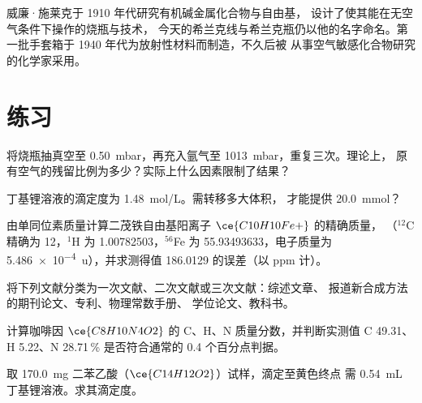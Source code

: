 \begin{history}[施莱克的玻璃仪器]
威廉·施莱克于 1910 年代研究有机碱金属化合物与自由基，
设计了使其能在无空气条件下操作的烧瓶与技术，
今天的希兰克线与希兰克瓶仍以他的名字命名。第一批手套箱于
1940 年代为放射性材料而制造，不久后被
从事空气敏感化合物研究的化学家采用。
\end{history}

\section{练习}

\begin{exercise}[$\star$]\label{exo:b3:lab-techniques-3:1}
将烧瓶抽真空至 \qty{0.50}{mbar}，再充入氩气至 \qty{1013}{mbar}，重复三次。理论上，
原有空气的残留比例为多少？实际上什么因素限制了结果？
\end{exercise}

\begin{exercise}[$\star$]\label{exo:b3:lab-techniques-3:2}
丁基锂溶液的滴定度为 \qty{1.48}{mol/L}。需转移多大体积，
才能提供 \qty{20.0}{mmol}？
\end{exercise}

\begin{exercise}[$\star$]\label{exo:b3:lab-techniques-3:3}
由单同位素质量计算二茂铁自由基阳离子 $\ce{C10H10Fe+}$ 的精确质量，
（$^{12}$C 精确为 12，$^1$H 为 1.00782503，$^{56}$Fe 为 55.93493633，电子质量为 \qty{5.486e-4}{u}），并求测得值
186.0129 的误差（以 ppm 计）。
\end{exercise}

\begin{exercise}[$\star$]\label{exo:b3:lab-techniques-3:4}
将下列文献分类为一次文献、二次文献或三次文献：综述文章、
报道新合成方法的期刊论文、专利、物理常数手册、
学位论文、教科书。
\end{exercise}

\begin{exercise}[$\star\star$]\label{exo:b3:lab-techniques-3:5}
计算咖啡因 $\ce{C8H10N4O2}$ 的 C、H、N 质量分数，并判断实测值
C 49.31、H 5.22、N 28.71\,\% 是否符合通常的 0.4 个百分点判据。
\end{exercise}

\begin{exercise}[$\star\star$]\label{exo:b3:lab-techniques-3:6}
取 \qty{170.0}{mg} 二苯乙酸（$\ce{C14H12O2}$）试样，滴定至黄色终点
需 \qty{0.54}{mL} 丁基锂溶液。求其滴定度。
\end{exercise}

